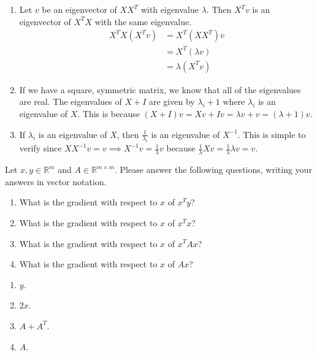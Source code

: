 \documentclass{harvardml}
\newcommand{\R}{\mathbb{R}}
\begin{document}
\begin{enumerate}[label=(\alph*)]
\item  Let $v$ be an eigenvector of $XX^T$ with eigenvalue $\lambda$. Then $X^Tv$ is an eigenvector of $X^TX$ with the same eigenvalue.
\begin{align*}
X^TX(X^Tv) &= X^T(XX^T)v \\
&= X^T(\lambda v) \\
&= \lambda(X^Tv)
\end{align*}
\item If we have a square, symmetric matrix, we know that all of the eigenvalues are real. The eigenvalues of $X+I$ are given by $\lambda_i + 1$ where $\lambda_i$ is an eigenvalue of $X$. This is because $(X+I)v = Xv + Iv = \lambda v + v = (\lambda + 1)v$.
\item If $\lambda_i$ is an eigenvalue of $X$, then $\frac{1}{\lambda_i}$ is an eigenvalue of $X^{-1}$. This is simple to verify since $XX^{-1}v = v \implies X^{-1}v = \frac{1}{\lambda}v$ because $\frac{1}{\lambda}Xv = \frac{1}{\lambda}{\lambda}v = v$.
\end{enumerate}


\begin{problem}[Calculus]
Let $x, y \in \R^m$ and $A \in \R^{m \times m}$. Please answer the following questions, writing your answers in vector notation.
\begin{enumerate}[label=(\alph*)]
\item What is the gradient with respect to $x$ of $x^T y$?
\item What is the gradient with respect to $x$ of $x^T x$?
\item What is the gradient with respect to $x$ of $x^T A x$?
\item What is the gradient with respect to $x$ of $A x$?
\end{enumerate}
\end{problem}

\begin{enumerate}[label=(\alph*)]
\item $y$.
\item $2x$.
\item $A + A^T$.
\item $A$.
\end{enumerate}

\end{document}
